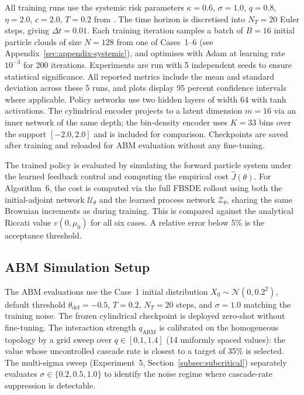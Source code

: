 \documentclass[11pt]{article}
\begin{document}
All training runs use the systemic risk parameters $\kappa = 0.6$, $\sigma = 1.0$, $q = 0.8$, $\eta = 2.0$, $c = 2.0$, $T = 0.2$ from \citet{pham2024mfnn}. The time horizon is discretised into $N_T = 20$ Euler steps, giving $\Delta t = 0.01$. Each training iteration samples a batch of $B = 16$ initial particle clouds of size $N = 128$ from one of Cases~1--6 (see Appendix~\ref{sec:appendix-systemic}), and optimises with Adam at learning rate $10^{-3}$ for 200 iterations. Experiments are run with 5 independent seeds to ensure statistical significance. All reported metrics include the mean and standard deviation across these 5 runs, and plots display 95 percent confidence intervals where applicable. Policy networks use two hidden layers of width 64 with tanh activations. The cylindrical encoder projects to a latent dimension $m = 16$ via an inner network of the same depth; the bin-density encoder uses $K = 33$ bins over the support $[-2.0, 2.0]$ and is included for comparison. Checkpoints are saved after training and reloaded for ABM evaluation without any fine-tuning.

The trained policy is evaluated by simulating the forward particle system under the learned feedback control and computing the empirical cost $\hat{J}(\theta)$. For Algorithm~6, the cost is computed via the full FBSDE rollout using both the initial-adjoint network $\mathcal{U}_\theta$ and the learned process network $\mathcal{Z}_\theta$, sharing the same Brownian increments as during training. This is compared against the analytical Riccati value $v(0, \mu_0)$ for all six cases. A relative error below 5\% is the acceptance threshold.

\subsection{ABM Simulation Setup}

The ABM evaluations use the Case~1 initial distribution $X_0 \sim \mathcal{N}(0, 0.2^2)$, default threshold $\theta_{\mathrm{def}} = -0.5$, $T = 0.2$, $N_T = 20$ steps, and $\sigma = 1.0$ matching the training noise. The frozen cylindrical checkpoint is deployed zero-shot without fine-tuning. The interaction strength $q_{\mathrm{ABM}}$ is calibrated on the homogeneous topology by a grid sweep over $q \in [0.1, 1.4]$ (14 uniformly spaced values): the value whose uncontrolled cascade rate is closest to a target of 35\% is selected. The multi-sigma sweep (Experiment~5, Section~\ref{subsec:subcritical}) separately evaluates $\sigma \in \{0.2, 0.5, 1.0\}$ to identify the noise regime where cascade-rate suppression is detectable.
\end{document}
